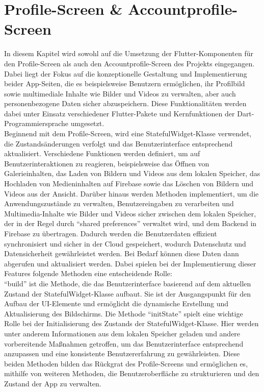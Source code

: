 \section{Profile-Screen \& Accountprofile-Screen}
In diesem Kapitel wird sowohl auf die Umsetzung der Flutter-Komponenten für den Profile-Screen als auch den Accountprofile-Screen des Projekts eingegangen.
Dabei liegt der Fokus auf die konzeptionelle Gestaltung und Implementierung beider App-Seiten, die es beispielsweise Benutzern ermöglichen, ihr Profilbild sowie multimediale Inhalte wie Bilder und Videos zu verwalten, aber auch personenbezogene Daten sicher abzuspeichern. 
Diese Funktionalitäten werden dabei unter Einsatz verschiedener Flutter-Pakete und Kernfunktionen der Dart-Programmiersprache umgesetzt. 
\\
Beginnend mit dem Profile-Screen, wird eine StatefulWidget-Klasse verwendet, die Zustandsänderungen verfolgt und das Benutzerinterface entsprechend aktualisiert.
Verschiedene Funktionen werden definiert, um auf Benutzerinteraktionen zu reagieren, beispielsweise das Öffnen von Galerieinhalten, das Laden von Bildern und Videos aus dem lokalen Speicher, das Hochladen von Medieninhalten auf Firebase sowie das Löschen von Bildern und Videos aus der Ansicht.
Darüber hinaus werden Methoden implementiert, um die Anwendungszustände zu verwalten, Benutzereingaben zu verarbeiten und Multimedia-Inhalte wie Bilder und Videos sicher zwischen dem lokalen Speicher, der in der Regel durch ``shared preferences'' verwaltet wird, und dem Backend in Firebase zu übertragen. 
Dadurch werden die Benutzerdaten effizient synchronisiert und sicher in der Cloud gespeichert, wodurch Datenschutz und Datensicherheit gewährleistet werden. 
Bei Bedarf können diese Daten dann abgerufen und aktualisiert werden. Dabei spielen bei der Implementierung dieser Features folgende Methoden eine entscheidende Rolle:
\\``build'' ist die Methode, die das Benutzerinterface basierend auf dem aktuellen Zustand der StatefulWidget-Klasse aufbaut. Sie ist der Ausgangspunkt für den Aufbau der UI-Elemente und ermöglicht die dynamische Erstellung und Aktualisierung des Bildschirms. 
Die Methode ``initState'' spielt eine wichtige Rolle bei der Initialisierung des Zustands der StatefulWidget-Klasse. Hier werden unter anderem Informationen aus dem lokalen Speicher geladen und andere vorbereitende Maßnahmen getroffen, um das Benutzerinterface entsprechend anzupassen und eine konsistente Benutzererfahrung zu gewährleisten. 
Diese beiden Methoden bilden das Rückgrat des Profile-Screens und ermöglichen es, mithilfe von weiteren Methoden, die Benutzeroberfläche zu strukturieren und den Zustand der App zu verwalten.

